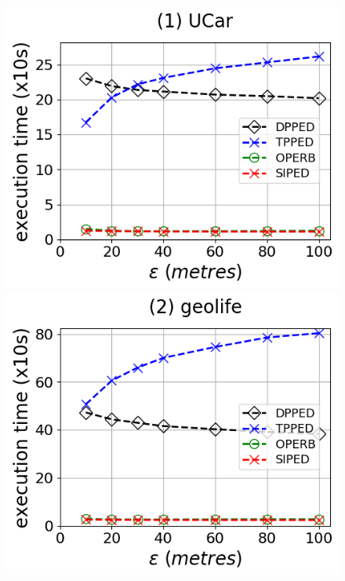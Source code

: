 \begin{figure}[tb!]
	\centering
	\includegraphics[scale=0.315]{Figures/Exp-PED-time-epsilon-service.png}	\hspace{1ex}
	\includegraphics[scale=0.315]{Figures/Exp-PED-time-epsilon-geolife.png}	\hspace{1ex}

\end{figure}
